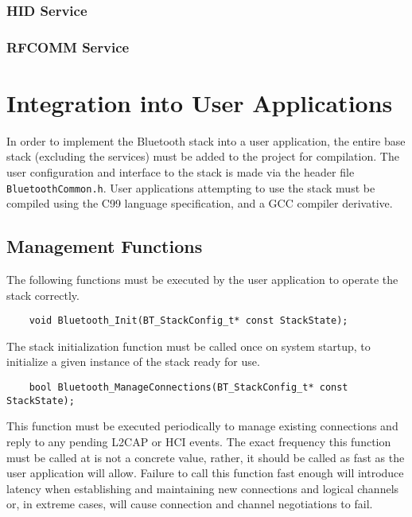 
\FloatBarrier
\subsubsection{HID Service}


\FloatBarrier
\subsubsection{RFCOMM Service}


\section{Integration into User Applications}

In order to implement the Bluetooth stack into a user application, the entire base stack (excluding the services) must be added to the project for compilation. The user configuration and interface to the stack is made via the header file \texttt{BluetoothCommon.h}. User applications attempting to use the stack must be compiled using the C99 language specification, and a GCC compiler derivative.

\FloatBarrier
\subsection{Management Functions}

The following functions must be executed by the user application to operate the stack correctly.

\vspace{1em}
\begin{lstlisting}
	void Bluetooth_Init(BT_StackConfig_t* const StackState);
\end{lstlisting}

The stack initialization function must be called once on system startup, to initialize a given instance of the stack ready for use.

\vspace{1em}
\begin{lstlisting}
	bool Bluetooth_ManageConnections(BT_StackConfig_t* const StackState);
\end{lstlisting}

This function must be executed periodically to manage existing connections and reply to any pending L2CAP or HCI events. The exact frequency this function must be called at is not a concrete value, rather, it should be called as fast as the user application will allow. Failure to call this function fast enough will introduce latency when establishing and maintaining new connections and logical channels or, in extreme cases, will cause connection and channel negotiations to fail.
	
